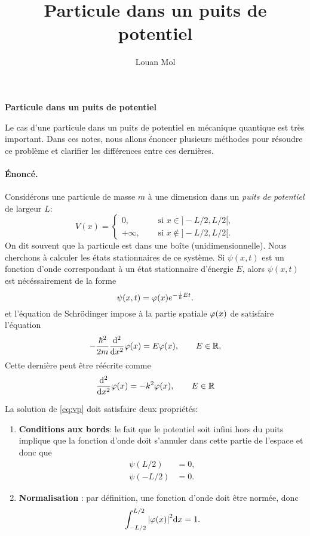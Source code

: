 \documentclass[11pt,a4paper,oneside]{article}
\title{Particule dans un puits de potentiel}
\author{Louan Mol}
\begin{document}
\begin{center}
    {\huge \textbf{Particule dans un puits de potentiel}}
\end{center}

\vspace{1cm}

Le cas d'une particule dans un puits de potentiel en mécanique quantique est très important. Dans ces notes, nous allons énoncer plusieurs méthodes pour résoudre ce problème et clarifier les différences entre ces dernières.

\paragraph{Énoncé.} Considérons une particule de masse $m$ à une dimension dans un \emph{puits de potentiel} de largeur $L$:
\begin{equation}
    V(x)=
    \begin{cases}
        0,\quad &\text{ si } x\in]-L/2,L/2[,\\
        +\infty,\quad &\text{ si } x\notin]-L/2,L/2[.
    \end{cases}
\end{equation}
On dit souvent que la particule est dans une boîte (unidimensionnelle). Nous cherchons à calculer les états stationnaires de ce système. Si $\psi(x,t)$ est un fonction d'onde correspondant à un état stationnaire d'énergie $E$, alors $\psi(x,t)$ est nécéssairement de la forme 
\begin{equation}
    \psi(x,t)=\varphi(x)e^{-\frac{i}{\hbar}Et}.
\end{equation}
et l'équation de Schrödinger impose à la partie spatiale $\varphi(x)$ de satisfaire l'équation
\begin{equation}
    -\frac{\hbar^2}{2m}\dv[2]{}{x}\varphi(x)=E\varphi(x),\qquad E\in\mathbb{R},
\end{equation}
Cette dernière peut être réécrite comme
\begin{equation}
    \dv[2]{}{x}\varphi(x)=-k^2\varphi(x),\qquad E\in\mathbb{R} \label{eq:vp}
\end{equation}

La solution de \eqref{eq:vp} doit satisfaire deux propriétés:
\begin{enumerate}
    \item \textbf{Conditions aux bords}: le fait que le potentiel soit infini hors du puits implique que la fonction d'onde doit s'annuler dans cette partie de l'espace et donc que
    \begin{align}
        \psi(L/2) &= 0,\\
        \psi(-L/2) &= 0.
    \end{align}
    \item \textbf{Normalisation} : par définition, une fonction d'onde doit être normée, donc
    \begin{equation}
        \int_{-L/2}^{L/2}\abs{\varphi(x)}^2\text{d} x = 1.
    \end{equation}
\end{enumerate}
\end{document}
